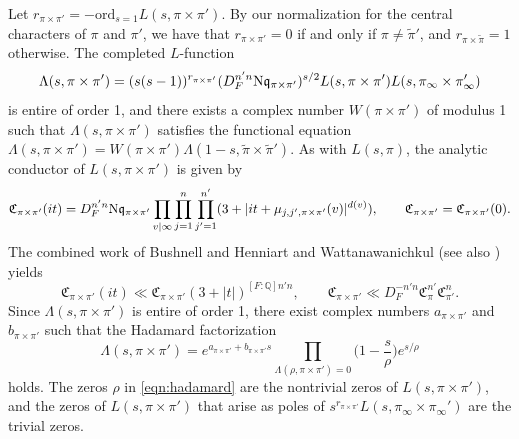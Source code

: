 \documentclass[11pt]{amsart}
\theoremstyle{remark}
\numberwithin{equation}{section}
\newcommand{\kq}{\mathfrak{q}}
\newcommand{\N}{\textnormal{N}}
\newcommand{\Q}{\mathbb{Q}}
\begin{document}
Let $r_{\pi\times\pi'} = -\mathrm{ord}_{s=1}L(s,\pi\times\pi')$.  By our normalization for the central characters of $\pi$ and $\pi'$, we have that $r_{\pi\times\pi'}=0$ if and only if $\pi\neq \widetilde{\pi}'$, and $r_{\pi\times\widetilde{\pi}}=1$ otherwise.  The completed $L$-function
\begin{equation}
\label{eqn:Lambdaspixpi'}
\Lambda(s,\pi\times\pi')=(s(s-1))^{r_{\pi\times\pi'}}(D_F^{n'n}\N\kq_{\pi\times\pi'})^{s/2}L(s,\pi\times\pi')L(s,\pi_{\infty}\times\pi_{\infty}')
\end{equation}
is entire of order 1, and there exists a complex number $W(\pi\times\pi')$ of modulus 1 such that $\Lambda(s,\pi\times\pi')$ satisfies the functional equation $\Lambda(s,\pi\times\pi')=W(\pi\times\pi')\Lambda(1-s,\widetilde{\pi}\times\widetilde{\pi}')$.  As with $L(s,\pi)$, the analytic conductor of $L(s,\pi\times\pi')$ is given by
\begin{equation}
\label{eqn:analytic_conductor_def_2}
\mathfrak{C}_{\pi\times\pi'}(it)= D_F^{n'n}\N\kq_{\pi\times\pi'}\prod_{v|\infty}\prod_{j=1}^n \prod_{j'=1}^{n'}(3+|it+\mu_{j,j',\pi\times\pi'}(v)|^{d(v)}),\qquad \mathfrak{C}_{\pi\times\pi'}= \mathfrak{C}_{\pi\times\pi'}(0).
\end{equation}
The combined work of Bushnell and Henniart \cite{BH} and Wattanawanichkul \cite[Lemma A.1]{Wattanawanichkul} (see also \cite[Appendix]{humphries2019standard}) yields
\begin{equation}
\label{eqn:BH}
\mathfrak{C}_{\pi\times\pi'}(it)\ll \mathfrak{C}_{\pi\times\pi'}(3+|t|)^{[F:\Q] n'n},\qquad \mathfrak{C}_{\pi\times\pi'}\ll D_F^{-n'n}\mathfrak{C}_{\pi}^{n'}\mathfrak{C}_{\pi'}^{n}.
\end{equation}
Since $\Lambda(s,\pi\times\pi')$ is entire of order 1, there exist complex numbers $a_{\pi\times\pi'}$ and $b_{\pi\times\pi'}$ such that the Hadamard factorization
\begin{equation}
\label{eqn:hadamard}
\Lambda(s,\pi\times\pi')=e^{a_{\pi\times\pi'}+b_{\pi\times\pi'}s}\prod_{\Lambda(\rho,\pi\times\pi')=0}\Big(1-\frac{s}{\rho}\Big)e^{s/\rho}
\end{equation}
holds.  The zeros $\rho$ in \eqref{eqn:hadamard} are the nontrivial zeros of $L(s,\pi\times\pi')$, and the zeros of $L(s,\pi\times\pi')$ that arise as poles of $s^{r_{\pi\times\pi'}}L(s,\pi_{\infty}\times\pi_{\infty}')$ are the trivial zeros.
\end{document}
